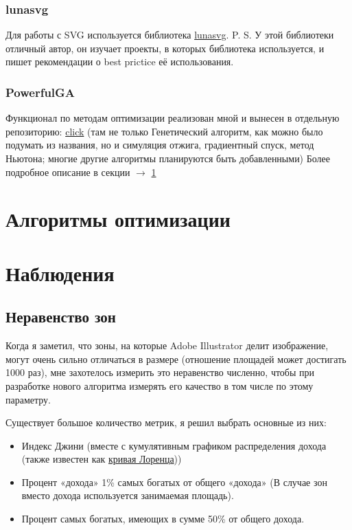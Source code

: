 \documentclass[11pt]{article}
\begin{document}
    \subsubsection{lunasvg}
    Для работы с SVG используется библиотека \href{https://github.com/sammycage/lunasvg}{lunasvg}.
    P. S. У этой библиотеки отличный автор, он изучает проекты, в которых библиотека используется, и пишет рекомендации о best prictice её использования.

    \subsubsection{PowerfulGA}
    Функционал по методам оптимизации реализован мной и вынесен в отдельную репозиторию: \href{https://github.com/donRumata03/PowerfulGA}{click}
    (там не только Генетический алгоритм, как можно было подумать из названия, но и симуляция отжига, градиентный спуск, метод Ньютона;
    многие другие алгоритмы планируются быть добавленными)
    Более подробное описание в секции $\longrightarrow$ \ref{sec:opimization_algorithms}

    \section {Алгоритмы оптимизации}\label{sec:opimization_algorithms}
    

    \section{Наблюдения}\label{sec:observations}

    \subsection{Неравенство зон}\label{subsec:inequality}
    Когда я заметил, что зоны, на которые Adobe Illustrator делит изображение, могут очень сильно отличаться в размере (отношение площадей может достигать 1000 раз),
    мне захотелось измерить это неравенство численно, чтобы при разработке нового алгоритма измерять его качество в том числе по этому параметру.

    Существует большое количество метрик, я решил выбрать основные из них:
    \begin{itemize}
        \item Индекс Джини (вместе с кумулятивным графиком распределения дохода (также известен как \href{https://en.wikipedia.org/wiki/Lorenz_curve}{кривая Лоренца}))
        \item Процент «дохода» 1\% самых богатых от общего «дохода» (В случае зон вместо дохода используется занимаемая площадь).
        \item Процент самых богатых, имеющих в сумме 50\% от общего дохода.
    \end{itemize}
\end{document}
